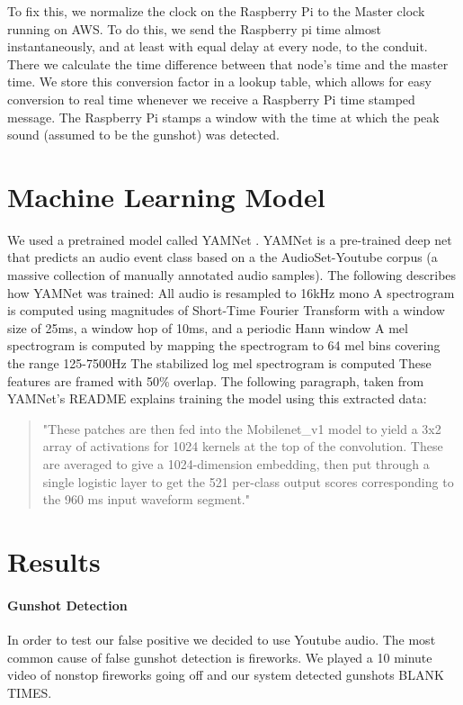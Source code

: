 \documentclass[conference]{IEEEtran}
\begin{document}
To fix this, we normalize the clock on the Raspberry Pi to the Master clock running on AWS. To do this, we send the Raspberry pi time almost instantaneously, and at least with equal delay at every node, to the conduit. There we calculate the time difference between that node’s time and the master time. We store this conversion factor in a lookup table, which allows for easy conversion to real time whenever we receive a Raspberry Pi time stamped message. The Raspberry Pi stamps a window with the time at which the peak sound (assumed to be the gunshot) was detected.

\section{Machine Learning Model}
We used a pretrained model called YAMNet  \cite{b6}. YAMNet is a pre-trained deep net that predicts an audio event class based on a the AudioSet-Youtube corpus (a massive collection of manually annotated audio samples). The following describes how YAMNet was trained: 
    All audio is resampled to 16kHz mono
    A spectrogram is computed using magnitudes of Short-Time Fourier Transform with a window size of 25ms, a window hop of 10ms, and a periodic Hann window
    A mel spectrogram is computed by mapping the spectrogram to 64 mel bins covering the range 125-7500Hz
    The stabilized log mel spectrogram is computed 
    These features are framed with 50\% overlap. 
The following paragraph, taken from YAMNet’s README explains training the model using this extracted data:
\begin{quote}
"These patches are then fed into the Mobilenet\_v1 model to yield a 3x2 array of activations for 1024 kernels at the top of the convolution. These are averaged to give a 1024-dimension embedding, then put through a single logistic layer to get the 521 per-class output scores corresponding to the 960 ms input waveform segment."
\end{quote}


\section{Results}


\paragraph{Gunshot Detection}
In order to test our false positive we decided to use Youtube audio. The most common cause of false gunshot detection is fireworks. We played a 10 minute video of nonstop fireworks going off and our system detected gunshots BLANK TIMES.
\end{document}
